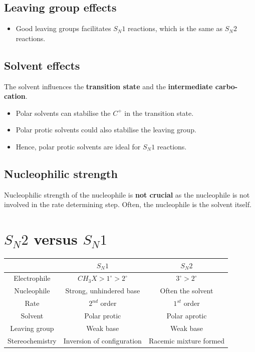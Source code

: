 \documentclass[11pt]{article}
\begin{document}
\subsection{Leaving group effects}
\label{sec:org1ab597a}
\begin{itemize}
\item Good leaving groups facilitates \(S_N 1\) reactions, which is the same as \(S_N 2\) reactions.
\end{itemize}

\subsection{Solvent effects}
\label{sec:org1a29420}
The solvent influences the \textbf{transition state} and the \textbf{intermediate carbo-cation}.

\begin{itemize}
\item Polar solvents can stabilise the \(C^+\) in the transition state.
\item Polar protic solvents could also stabilise the leaving group.
\item Hence, polar protic solvents are ideal for \(S_N 1\) reactions.
\end{itemize}

\subsection{Nucleophilic strength}
\label{sec:org2a145ed}
Nucleophilic strength of the nucleophile is \textbf{not crucial} as the nucleophile is not involved in the rate determining step. Often, the nucleophile is the solvent itself.


\section{\(S_N 2\) versus \(S_N 1\)}
\label{sec:org953be1f}
\begin{tabular}{c|c|c}
& \(S_N 1\) & \(S_N 2\) \\
\hline
Electrophile & \(CH_3 X > 1^{\circ} > 2^{\circ}\) & \(3^{\circ} > 2^{\circ}\) \\
Nucleophile & Strong, unhindered base & Often the solvent \\
Rate & \(2^{nd}\) order & \(1^{st}\) order \\
Solvent & Polar protic & Polar aprotic \\
Leaving group & Weak base & Weak base \\
Stereochemistry & Inversion of configuration & Racemic mixture formed \\
\end{tabular}
\end{document}

